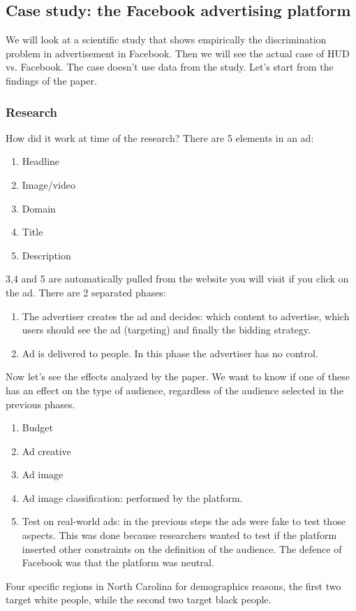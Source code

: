 \subsection{Case study: the Facebook advertising platform}
We will look at a scientific study that shows empirically the discrimination problem in advertisement in Facebook. Then we will see the actual case of HUD vs. Facebook. The case doesn't use data from the study. Let's start from the findings of the paper.
\subsubsection{Research}
How did it work at time of the research? There are 5 elements in an ad:
\begin{enumerate}
    \item Headline
    \item Image/video
    \item Domain 
    \item Title
    \item Description
\end{enumerate}
3,4 and 5 are automatically pulled from the website you will visit if you click on the ad. There are 2 separated phases:
\begin{enumerate}
    \item The advertiser creates the ad and decides: which content to advertise, which users should see the ad (targeting) and finally the bidding strategy.
    \item Ad is delivered to people. In this phase the advertiser has no control.
\end{enumerate} 
Now let's see the effects analyzed by the paper. We want to know if one of these has an effect on the type of audience, regardless of the audience selected in the previous phases.
\begin{enumerate}
    \item Budget
    \item Ad creative
    \item Ad image
    \item Ad image classification: performed by the platform.
    \item Test on real-world ads: in the previous steps the ads were fake to test those aspects. This was done because researchers wanted to test if the platform inserted other constraints on the definition of the audience. The defence of Facebook was that the platform was neutral.
\end{enumerate}
Four specific regions in North Carolina for demographics reasons, the first two target white people, while the second two target black people.

